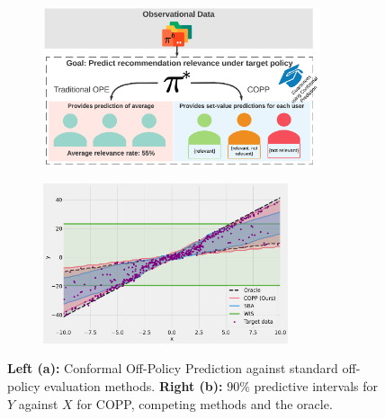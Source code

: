 \begin{figure}
     \centering
     \begin{subfigure}[t]{0.5\textwidth}
         \centering
         \includegraphics[height=1.85in]{figures/copp/COPP7.png}
     \end{subfigure}%
     \begin{subfigure}[t]{0.5\textwidth}
         \centering
         \includegraphics[height=1.85in]{figures/copp/cis-updated.png}
     \end{subfigure}

    \caption{\textbf{Left (a):} Conformal Off-Policy Prediction against standard off-policy evaluation methods. \textbf{Right (b):} $90\%$ predictive intervals for $Y$ against $X$ for COPP, competing methods and the oracle.}\label{fig:copp}
\end{figure}



